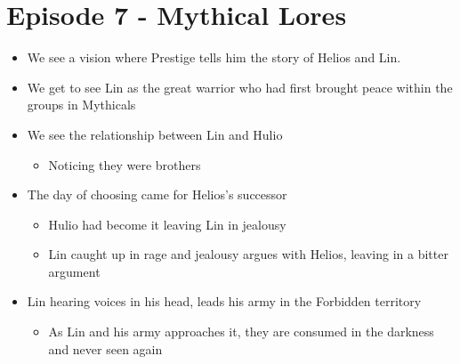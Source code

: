 \documentclass[12pt, letterpaper]{article}
\begin{document}
\section*{Episode 7 - Mythical Lores}
\begin{itemize}
   \item We see a vision where Prestige tells him the story of Helios and Lin.
   \item We get to see Lin as the great warrior who had first brought peace within the groups in Mythicals
   \item We see the relationship between Lin and Hulio
   \begin{itemize}
      \item  Noticing they were brothers
   \end{itemize}
   \item The day of choosing came for Helios’s successor
   \begin{itemize}
      \item Hulio had become it leaving Lin in jealousy
      \item Lin caught up in rage and jealousy argues with Helios, leaving in a bitter argument
   \end{itemize}
   \item Lin hearing voices in his head, leads his army in the Forbidden territory
   \begin{itemize}
      \item As Lin and his army approaches it, they are consumed in the darkness and never seen again
   \end{itemize}
\end{itemize}
\end{document}
